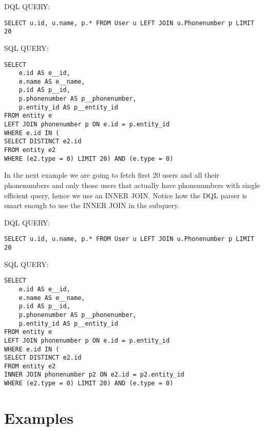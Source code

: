 \documentclass[11pt,a4paper]{report}
\begin{document}
DQL QUERY:

\begin{verbatim}
SELECT u.id, u.name, p.* FROM User u LEFT JOIN u.Phonenumber p LIMIT 20
\end{verbatim}

SQL QUERY:

\begin{verbatim}
SELECT
    e.id AS e__id,
    e.name AS e__name,
    p.id AS p__id,
    p.phonenumber AS p__phonenumber,
    p.entity_id AS p__entity_id
FROM entity e
LEFT JOIN phonenumber p ON e.id = p.entity_id
WHERE e.id IN (
SELECT DISTINCT e2.id
FROM entity e2
WHERE (e2.type = 0) LIMIT 20) AND (e.type = 0)
\end{verbatim}

In the next example we are going to fetch first 20 users and all their phonenumbers and only those users that actually have phonenumbers with single efficient query, hence we use an INNER JOIN. Notice how the DQL parser is smart enough to use the INNER JOIN in the subquery.

DQL QUERY:

\begin{verbatim}
SELECT u.id, u.name, p.* FROM User u LEFT JOIN u.Phonenumber p LIMIT 20
\end{verbatim}

SQL QUERY:

\begin{verbatim}
SELECT
    e.id AS e__id,
    e.name AS e__name,
    p.id AS p__id,
    p.phonenumber AS p__phonenumber,
    p.entity_id AS p__entity_id
FROM entity e
LEFT JOIN phonenumber p ON e.id = p.entity_id
WHERE e.id IN (
SELECT DISTINCT e2.id
FROM entity e2
INNER JOIN phonenumber p2 ON e2.id = p2.entity_id
WHERE (e2.type = 0) LIMIT 20) AND (e.type = 0)
\end{verbatim}

\section{Examples}
\end{document}
